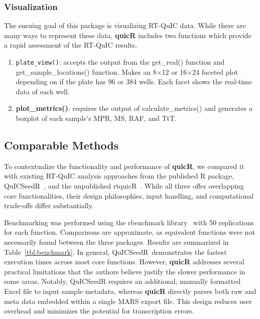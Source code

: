 \documentclass[preprint,12pt,a4paper]{elsarticle}
\begin{document}
            \subsubsection{Visualization}
                The ensuing goal of this package is visualizing RT-QuIC data. While there are many ways to represent these data, \textbf{quicR} includes two functions which provide a rapid assessment of the RT-QuIC results.
                \begin{enumerate}
                    \item \texttt{plate\_view()}: accepts the output from the get\_real() function and get\_sample\_locations() function. Makes an 8$\times$12 or 16$\times$24 faceted plot depending on if the plate has 96 or 384 wells. Each facet shows the real-time data of each well.
                    \item \textbf{plot\_metrics()}: requires the output of calculate\_metrics() and generates a boxplot of each sample's MPR, MS, RAF, and TtT.
                \end{enumerate}
        
        \subsection{Comparable Methods}
            To contextualize the functionality and performance of \textbf{quicR}, we compared it with existing RT-QuIC analysis approaches from the published R package, QuICSeedR\ \cite{Li2025}, and the unpublished rtquicR\ \cite{Slota2023}. While all three offer overlapping core functionalities, their design philosophies, input handling, and computational trade-offs differ substantially.

            Benchmarking was performed using the rbenchmark library~\cite{rbenchmark} with 50 replications for each function. Comparisons are approximate, as equivalent functions were not necessarily found between the three packages. Results are summarized in Table~\ref{tbl:benchmark}. In general, QuICSeedR\ demonstrates the fastest execution times across most core functions. However, \textbf{quicR} addresses several practical limitations that the authors believe justify the slower performance in some areas. Notably, QuICSeedR requires an additional, manually formatted Excel file to input sample metadata, whereas \textbf{quicR} directly parses both raw and meta data embedded within a single MARS export file. This design reduces user overhead and minimizes the potential for transcription errors.
\end{document}
